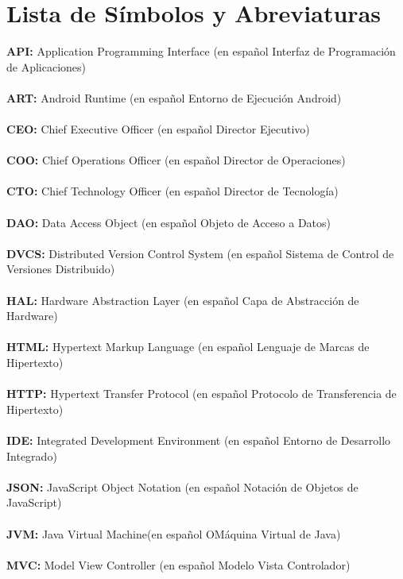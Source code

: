 \chapter*{Lista de Símbolos y Abreviaturas}%

\vspace{5 mm}
\noindent
\textbf{API:} Application Programming Interface (en español Interfaz de Programación de Aplicaciones)\\ \\
\textbf{ART:} Android Runtime (en español Entorno de Ejecución Android)\\ \\
\textbf{CEO:} Chief Executive Officer (en español Director Ejecutivo)\\ \\
\textbf{COO:} Chief Operations Officer (en español Director de Operaciones)\\ \\
\textbf{CTO:} Chief Technology Officer (en español Director de Tecnología)\\ \\
\textbf{DAO:} Data Access Object (en español Objeto de Acceso a Datos)\\ \\
\textbf{DVCS:} Distributed Version Control System (en español Sistema de Control de Versiones Distribuido)\\ \\
\textbf{HAL:} Hardware Abstraction Layer (en español Capa de Abstracción de Hardware)\\ \\
\textbf{HTML:} Hypertext Markup Language (en español Lenguaje de Marcas de Hipertexto)\\ \\
\textbf{HTTP:} Hypertext Transfer Protocol (en español Protocolo de Transferencia de Hipertexto)\\ \\
\textbf{IDE:} Integrated Development Environment (en español Entorno de Desarrollo Integrado)\\ \\
\textbf{JSON:} JavaScript Object Notation (en español Notación de Objetos de JavaScript)\\ \\
\textbf{JVM:} Java Virtual Machine(en español OMáquina Virtual de Java)\\ \\
\textbf{MVC:} Model View Controller (en español Modelo Vista Controlador)\\ \\

